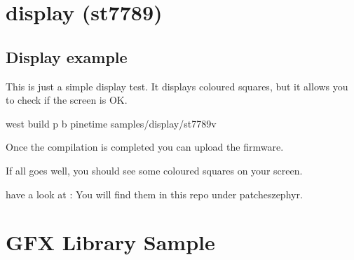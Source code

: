 \documentclass[letterpaper,10pt,english]{sphinxmanual}
\begin{document}
\chapter{display (st7789)}
\label{\detokenize{display:display-st7789}}\label{\detokenize{display:display-sample}}\label{\detokenize{display::doc}}

\section{Display    example}
\label{\detokenize{display:display-example}}
This is just a simple display test.
It displays coloured squares, but it allows you to check if the screen is OK.


\begin{sphinxVerbatim}[commandchars=\\\{\}]
       

         
      
\end{sphinxVerbatim}

\begin{sphinxVerbatim}[commandchars=\\\{\}]
  west build \PYGZhy{}p \PYGZhy{}b pinetime samples/display/st7789v
\end{sphinxVerbatim}

Once the compilation is completed you can upload the firmware.

If all goes well, you should see some coloured squares on your screen.


have a look at : 
You will find them in this repo under patches\sphinxhyphen{}zephyr.


\chapter{GFX Library Sample}
\label{\detokenize{gfx:gfx-library-sample}}\label{\detokenize{gfx:gfx-sample}}\label{\detokenize{gfx::doc}}
\end{document}
